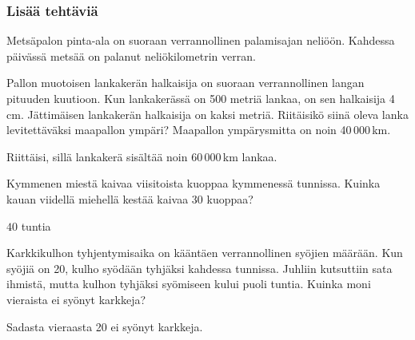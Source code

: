 \begin{tehtavasivu}
\subsubsection*{Lisää tehtäviä}

\begin{tehtava}
	Metsäpalon pinta-ala on suoraan verrannollinen palamisajan neliöön. Kahdessa päivässä metsää on palanut neliökilometrin verran. 
	\begin{alakohdat}
\end{alakohdat} 
	\begin{vastaus}
		\begin{alakohdat}
\end{alakohdat} 
	\end{vastaus}
\end{tehtava}

\begin{tehtava}
Pallon muotoisen lankakerän halkaisija on suoraan verrannollinen langan pituuden kuutioon. Kun lankakerässä on 500 metriä lankaa, on sen halkaisija 4 cm. Jättimäisen lankakerän halkaisija on kaksi metriä. Riitäisikö siinä oleva lanka levitettäväksi maapallon ympäri? Maapallon ympärysmitta on noin 40\,000\,km.
\begin{vastaus}
Riittäisi, sillä lankakerä sisältää noin $60\,000$\,km lankaa.
\end{vastaus}
\end{tehtava}

\begin{tehtava}
	Kymmenen miestä kaivaa viisitoista kuoppaa kymmenessä tunnissa.
	Kuinka kauan viidellä miehellä kestää kaivaa $30$ kuoppaa?	
	\begin{vastaus}
		$40$ tuntia
	\end{vastaus}
\end{tehtava}


\begin{tehtava}
	Karkkikulhon tyhjentymisaika on kääntäen verrannollinen syöjien määrään. Kun syöjiä on 20, kulho syödään tyhjäksi kahdessa tunnissa. Juhliin kutsuttiin sata ihmistä, mutta kulhon tyhjäksi syömiseen kului puoli tuntia. Kuinka moni vieraista ei syönyt karkkeja?
	\begin{vastaus}
		Sadasta vieraasta 20 ei syönyt karkkeja.
	\end{vastaus}
\end{tehtava}


\end{tehtavasivu}

